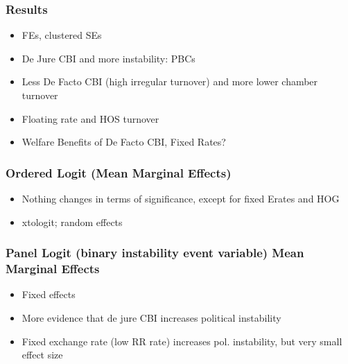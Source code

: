 \documentclass[]{beamer}
\begin{document}
    \begin{frame}
        \frametitle{Results}
        \begin{itemize}
            \item FEs, clustered SEs
            \item De Jure CBI and more instability: PBCs
            \item Less De Facto CBI (high irregular turnover) and more lower chamber turnover
            \item Floating rate and HOS turnover
            \item Welfare Benefits of De Facto CBI, Fixed Rates?
        \end{itemize}
    \end{frame}

    \begin{frame}
        {
            \let\oldcentering\centering
            \renewcommand\centering{\tiny\oldcentering}
            
        }
    \end{frame}

    \begin{frame}
        {
            \let\oldcentering\centering
            \renewcommand\centering{\tiny\oldcentering}
            
        }
    \end{frame}

    \begin{frame}
        \frametitle{Ordered Logit (Mean Marginal Effects)}
        \begin{itemize}
            \item Nothing changes in terms of significance, except for fixed Erates and HOG
            \item xtologit; random effects
        \end{itemize}
        
        
    \end{frame}


    \begin{frame}
        \frametitle{Panel Logit (binary instability event variable) Mean Marginal Effects}
        \begin{itemize}
            \item Fixed effects
            \item More evidence that de jure CBI increases political instability
            \item Fixed exchange rate (low RR rate) increases pol. instability, but very small effect size
        \end{itemize}
        
        
    \end{frame}
\end{document}
